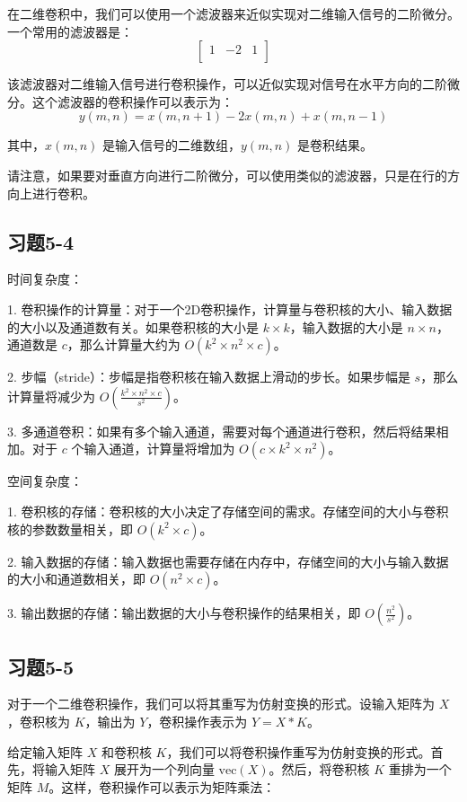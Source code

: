 \documentclass[]{article}
\begin{document}
在二维卷积中，我们可以使用一个滤波器来近似实现对二维输入信号的二阶微分。一个常用的滤波器是：
\[ 
\begin{bmatrix}
	1 & -2 & 1 \\
\end{bmatrix}
\]

该滤波器对二维输入信号进行卷积操作，可以近似实现对信号在水平方向的二阶微分。这个滤波器的卷积操作可以表示为：
\[ y(m, n) = x(m, n+1) - 2x(m, n) + x(m, n-1) \]

其中，\(x(m, n)\) 是输入信号的二维数组，\(y(m, n)\) 是卷积结果。

请注意，如果要对垂直方向进行二阶微分，可以使用类似的滤波器，只是在行的方向上进行卷积。


\subsection{习题5-4}
时间复杂度：

1. 卷积操作的计算量：对于一个2D卷积操作，计算量与卷积核的大小、输入数据的大小以及通道数有关。如果卷积核的大小是 \(k \times k\)，输入数据的大小是 \(n \times n\)，通道数是 \(c\)，那么计算量大约为 \(O(k^2 \times n^2 \times c)\)。

2. 步幅（stride）：步幅是指卷积核在输入数据上滑动的步长。如果步幅是 \(s\)，那么计算量将减少为 \(O\left(\frac{k^2 \times n^2 \times c}{s^2}\right)\)。

3. 多通道卷积：如果有多个输入通道，需要对每个通道进行卷积，然后将结果相加。对于 \(c\) 个输入通道，计算量将增加为 \(O(c \times k^2 \times n^2)\)。

空间复杂度：

1. 卷积核的存储：卷积核的大小决定了存储空间的需求。存储空间的大小与卷积核的参数数量相关，即 \(O(k^2 \times c)\)。

2. 输入数据的存储：输入数据也需要存储在内存中，存储空间的大小与输入数据的大小和通道数相关，即 \(O(n^2 \times c)\)。

3. 输出数据的存储：输出数据的大小与卷积操作的结果相关，即 \(O\left(\frac{n^2}{s^2}\right)\)。

\subsection{习题5-5}
对于一个二维卷积操作，我们可以将其重写为仿射变换的形式。设输入矩阵为 \(X\)，卷积核为 \(K\)，输出为 \(Y\)，卷积操作表示为 \(Y = X * K\)。

给定输入矩阵 \(X\) 和卷积核 \(K\)，我们可以将卷积操作重写为仿射变换的形式。首先，将输入矩阵 \(X\) 展开为一个列向量 \(\text{vec}(X)\)。然后，将卷积核 \(K\) 重排为一个矩阵 \(M\)。这样，卷积操作可以表示为矩阵乘法：
\end{document}
